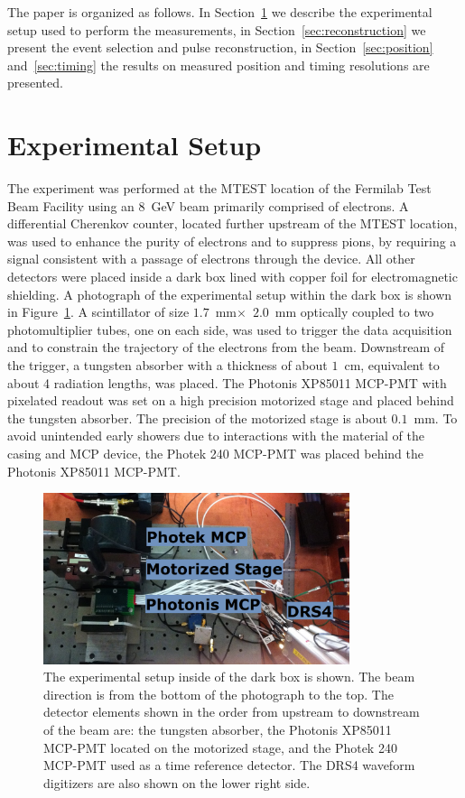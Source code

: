 The paper is organized as follows. In Section~\ref{sec:setup} we describe the
experimental setup used to perform the measurements, in
Section~\ref{sec:reconstruction} we present the event selection and pulse
reconstruction, in Section~\ref{sec:position} and~\ref{sec:timing} the results
on measured position and timing resolutions are presented. 

\section{Experimental Setup} \label{sec:setup} The experiment was performed at
the MTEST location of the Fermilab Test Beam Facility using an $8$~GeV beam
primarily comprised of electrons. A differential Cherenkov counter, located
further upstream of the MTEST location, was used to enhance the purity of
electrons and to suppress pions, by requiring a signal consistent with a passage
of electrons through the device. All other detectors were placed inside a dark
box lined with copper foil for electromagnetic shielding. A photograph of the
experimental setup within the dark box is shown in Figure~\ref{fig:setup}. A
scintillator of size $1.7$~mm$\times$~$2.0$~mm optically coupled to two
photomultiplier tubes, one on each side, was used to trigger the data
acquisition and to constrain the trajectory of the electrons from the beam.
Downstream of the trigger, a tungsten absorber with a thickness of about $1$~cm,
equivalent to about 4 radiation lengths, was placed. The Photonis XP85011
MCP-PMT with pixelated readout was set on a high precision motorized stage and
placed behind the tungsten absorber. The precision of the motorized stage is
about $0.1$~mm. To avoid unintended early showers due to interactions with the
material of the casing and MCP device, the Photek 240 MCP-PMT was placed behind
the Photonis XP85011 MCP-PMT. 

\begin{figure}[htbp] 
\centering
\includegraphics[width=0.8\textwidth]{Images/setup/setup.png} 
\caption{The experimental setup inside of the dark box is shown. The beam direction is from
the bottom of the photograph to the top. The detector elements shown in the
order from upstream to downstream of the beam are: the tungsten absorber, the
Photonis XP85011 MCP-PMT located on the motorized stage, and the Photek 240
MCP-PMT used as a time reference detector. The DRS4 waveform digitizers are also
shown on the lower right side.} 
\label{fig:setup} 
\end{figure} 

